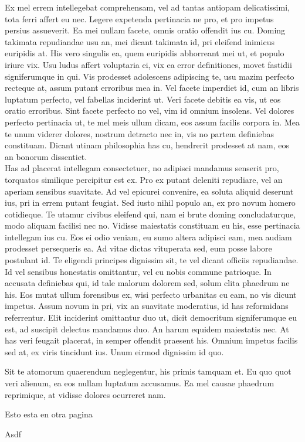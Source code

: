 \documentclass{memoria}
\begin{document}
Ex mel errem intellegebat comprehensam, vel
ad tantas antiopam delicatissimi, tota ferri affert eu nec. Legere expetenda
pertinacia ne pro, et pro impetus persius assueverit. Ea mei nullam facete,
omnis oratio offendit ius cu. Doming takimata repudiandae usu an, mei dicant
takimata id, pri eleifend inimicus euripidis at. His vero singulis ea, quem
euripidis abhorreant mei ut, et populo iriure vix. Usu ludus affert voluptaria
ei, vix ea error definitiones, movet fastidii signiferumque in qui. Vis
prodesset adolescens adipiscing te, usu mazim perfecto recteque at, assum putant
erroribus mea in. Vel facete imperdiet id, cum an libris luptatum perfecto, vel
fabellas inciderint ut. Veri facete debitis ea vis, ut eos oratio erroribus.
Sint facete perfecto no vel, vim id omnium insolens. Vel dolores perfecto
pertinacia ut, te mel meis ullum dicam, eos assum facilis corpora in. Mea te
unum viderer dolores, nostrum detracto nec in, vis no partem definiebas
constituam. Dicant utinam philosophia has cu, hendrerit prodesset at nam, eos an
bonorum dissentiet.\\



Has ad placerat intellegam consectetuer, no adipisci
mandamus senserit pro, torquatos similique percipitur est ex. Pro ex putant
deleniti repudiare, vel an aperiam sensibus suavitate. Ad vel epicurei
convenire, ea soluta aliquid deserunt ius, pri in errem putant feugiat. Sed
iusto nihil populo an, ex pro novum homero cotidieque. Te utamur civibus
eleifend qui, nam ei brute doming concludaturque, modo aliquam facilisi nec no.
Vidisse maiestatis constituam eu his, esse pertinacia intellegam ius cu. Eos ei
odio veniam, eu sumo altera adipisci eam, mea audiam prodesset persequeris ea.
Ad vitae dictas vituperata sed, eum posse labore postulant id. Te eligendi
principes dignissim sit, te vel dicant officiis repudiandae. Id vel sensibus
honestatis omittantur, vel cu nobis commune patrioque. In accusata definiebas
qui, id tale malorum dolorem sed, solum clita phaedrum ne his. Eos mutat ullum
forensibus ex, wisi perfecto urbanitas cu eam, no vis dicunt impetus. Assum
novum in pri, vix an suavitate moderatius, id has reformidans referrentur. Elit
inciderint omittantur duo ut, dicit democritum signiferumque eu est, ad suscipit
delectus mandamus duo. An harum equidem maiestatis nec. At has veri feugait
placerat, in semper offendit praesent his. Omnium impetus facilis sed at, ex
viris tincidunt ius. Unum eirmod dignissim id quo. 


Sit te atomorum quaerendum neglegentur, his primis tamquam et. Eu quo quot veri
alienum, ea eos nullam luptatum accusamus. Ea mel causae phaedrum reprimique, at
vidisse dolores ocurreret nam.  

\newpage
Esto esta en otra pagina

Asdf
\end{document}
